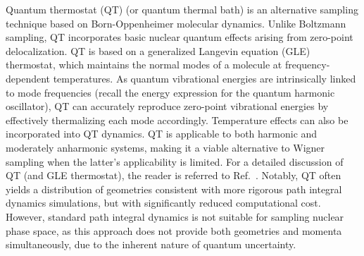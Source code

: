 \documentclass[9pt,bestpractices]{livecoms}
\begin{document}
Quantum thermostat (QT) \cite{ceriotti2009nuclear,ceriotti2010colored,Finocchi2022} (or quantum thermal bath) is an alternative sampling technique based on Born-Oppenheimer molecular dynamics. Unlike Boltzmann sampling, QT incorporates basic nuclear quantum effects arising from zero-point delocalization. QT is based on a generalized Langevin equation (GLE) thermostat, which maintains the normal modes of a molecule at frequency-dependent temperatures. As quantum vibrational energies are intrinsically linked to mode frequencies (recall the energy expression for the quantum harmonic oscillator), QT can accurately reproduce zero-point vibrational energies by effectively thermalizing each mode accordingly. Temperature effects can also be incorporated into QT dynamics. QT is applicable to both harmonic and moderately anharmonic systems\cite{suchan2018importance,Vuilleumier2013}, making it a viable alternative to Wigner sampling when the latter’s applicability is limited. For a detailed discussion of QT (and GLE thermostat), the reader is referred to Ref.~. Notably, QT often yields a distribution of geometries consistent with more rigorous path integral dynamics simulations, but with significantly reduced computational cost.\cite{prlj2023deciphering} However, standard path integral dynamics is not suitable for sampling nuclear phase space, as this approach does not provide both geometries and momenta simultaneously, due to the inherent nature of quantum uncertainty.
\end{document}
